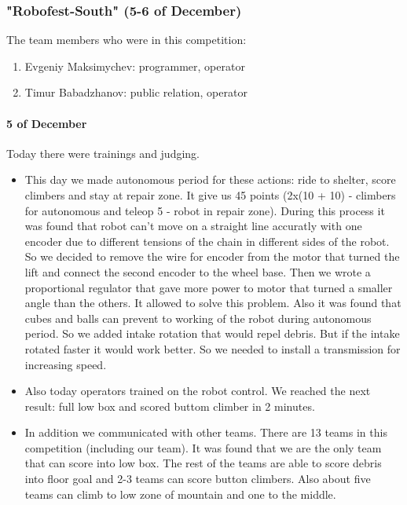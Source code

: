 \subsubsection{"Robofest-South" (5-6 of December)}
The team members who were in this competition:
\begin{enumerate}
	\item Evgeniy Maksimychev: programmer, operator 
	
	\item Timur Babadzhanov: public relation, operator 
\end{enumerate}
\paragraph{5 of December} 
Today there were trainings and judging.
\begin{itemize}
	\item This day we made autonomous period for these actions: ride to shelter, score climbers and stay at repair zone. It give us 45 points (2x(10 + 10) - climbers for autonomous and teleop 5 - robot in repair zone). During this process it was found that robot can't move on a straight line accuratly with one encoder due to different tensions of the chain in different sides of the robot. So we decided to remove the wire for encoder from the motor that turned the lift and connect the second encoder to the wheel base. Then we wrote a proportional regulator that gave more power to motor that turned a smaller angle than the others. It allowed to solve this problem. Also it was found that cubes and balls can prevent to working of the robot during autonomous period. So we added intake rotation that would repel debris. But if the intake rotated faster it would work better. So we needed to install a transmission for increasing speed.
	\item Also today operators trained on the robot control. We reached the next result: full low box and scored buttom climber in 2 minutes.
	\item In addition we communicated with other teams. There are 13 teams in this competition (including our team). It was found that we are the only team that can score into low box. The rest of the teams are able to score debris into floor goal and 2-3 teams can score button climbers. Also about five teams can climb to low zone of mountain and one to the middle.
\end{itemize}
